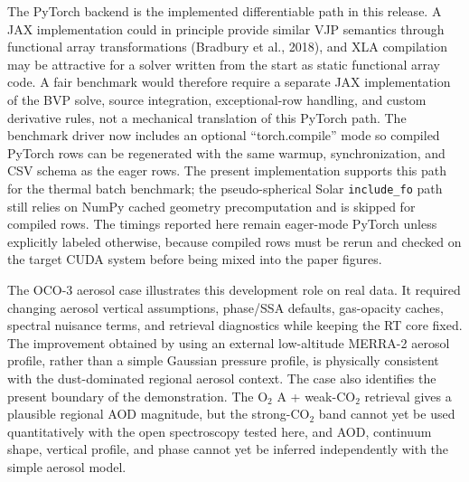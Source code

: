 \documentclass[gmd, manuscript]{copernicus}
\begin{document}
The PyTorch backend is the implemented differentiable path in this release.  A JAX
implementation could in principle provide similar VJP semantics through functional
array transformations (Bradbury et al., 2018), and XLA compilation may be attractive
for a solver written from the start as static functional array code.  A fair benchmark
would therefore require a separate JAX implementation of the BVP solve, source
integration, exceptional-row handling, and custom derivative rules, not a mechanical
translation of this PyTorch path.  The benchmark driver now includes an optional
``torch.compile'' mode so compiled PyTorch rows can be regenerated with the same
warmup, synchronization, and CSV schema as the eager rows.  The present implementation
supports this path for the thermal batch benchmark; the pseudo-spherical Solar
\texttt{include\_fo} path still relies on NumPy cached geometry precomputation and is skipped
for compiled rows.  The timings reported here remain eager-mode PyTorch unless
explicitly labeled otherwise, because compiled rows must be rerun and checked on the
target CUDA system before being mixed into the paper figures.

The OCO-3 aerosol case illustrates this development role on real data.  It required
changing aerosol vertical assumptions, phase/SSA defaults, gas-opacity caches, spectral
nuisance terms, and retrieval diagnostics while keeping the RT core fixed.  The
improvement obtained by using an external low-altitude MERRA-2 aerosol profile, rather
than a simple Gaussian pressure profile, is physically consistent with the
dust-dominated regional aerosol context.  The case also identifies the present boundary
of the demonstration.  The O$_2$ A + weak-CO$_2$ retrieval gives a plausible regional
AOD magnitude, but the strong-CO$_2$ band cannot yet be used quantitatively with the
open spectroscopy tested here, and AOD, continuum shape, vertical profile, and phase
cannot yet be inferred independently with the simple aerosol model.
\end{document}
